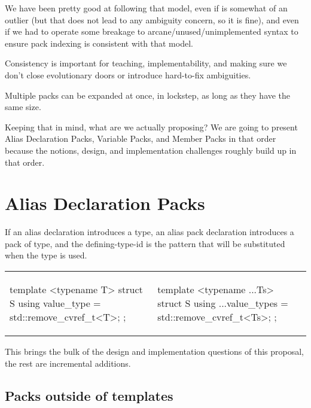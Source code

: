 \documentclass{wg21}
\begin{document}
We have been pretty good at following that model, even if  is somewhat of an outlier (but that does not lead to any ambiguity concern, so it is fine),
and even if we had to operate some breakage to arcane/unused/unimplemented syntax to ensure pack indexing is consistent with that model.

Consistency is important for teaching, implementability, and making sure we don't close evolutionary doors or introduce hard-to-fix ambiguities.

Multiple packs can be expanded at once, in lockstep, as long as they have the same size.

Keeping that in mind, what are we actually proposing?
We are going to present Alias Declaration Packs, Variable Packs, and Member Packs in that order because the notions, design, and implementation challenges roughly build up in that order.

\pagebreak
\section{Alias Declaration Packs}
If an alias declaration introduces a type, an alias pack declaration introduces a pack of type, and the defining-type-id is the pattern that will be substituted when the type is used.

\begin{center}
\begin{tabular}{l|l}
\begin{minipage}[t]{0.5\textwidth}
\begin{colorblock}
template <typename T>
struct S{
    using value_type = std::remove_cvref_t<T>;
};
\end{colorblock}
\end{minipage}
&
\begin{minipage}[t]{0.5\textwidth}
\begin{colorblock}
template <typename ...Ts>
struct S{
    using ...value_types = std::remove_cvref_t<Ts>;
};
\end{colorblock}
\end{minipage}
\\
\end{tabular}
\end{center}

This brings the bulk of the design and implementation questions of this proposal, the rest are incremental additions.

\subsection{Packs outside of templates}
\end{document}
